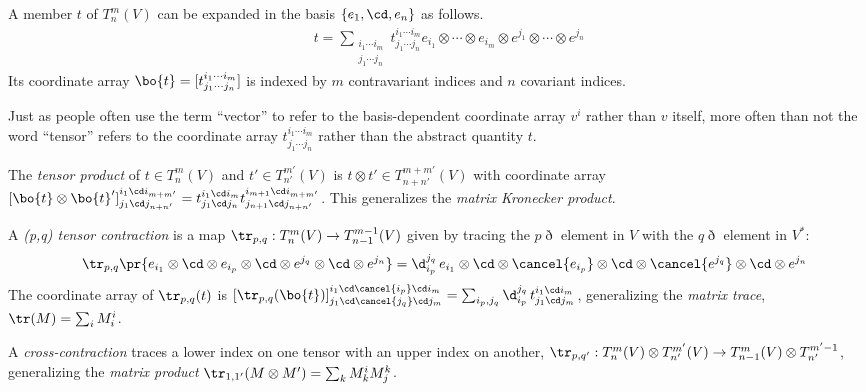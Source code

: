 \documentclass[11pt,fleqn]{article}
\numberwithin{equation}{section}
\begin{document}
\begin{rmk}
A member $t$ of $T_n^m(V)$ can be expanded in the basis $\{e_1,\cd,e_n\}$ as follows.
\begin{align}
&&
  t
=
  \sum_{\substack{i_1\cdots i_m\\j_1\cdots j_n}}
  t_{j_1\cdots j_n}^{i_1\cdots i_m}
  e_{i_1}\otimes\cdots\otimes e_{i_m}\otimes e^{j_1}\otimes\cdots\otimes e^{j_n}
\end{align}
Its coordinate array $\bo{t}=[t^{i_1\cdots i_m}_{j_1\cdots j_n}]$ is indexed by $m$ contravariant indices and $n$ covariant indices.
\end{rmk}

\begin{rmk}
Just as people often use the term ``vector'' to refer to the basis-dependent coordinate array $v^i$ rather than $v$ itself, more often than not the word ``tensor'' refers to the coordinate array $t^{i_1\cdots i_m}_{j_1\cdots j_n}$ rather than the abstract quantity $t$.
\end{rmk}

\begin{dfn}
The \textit{tensor product} of $t\in T_n^m(V)$ and $t'\in T_{n'}^{m'}(V)$ is $t\otimes t'\in T_{n+n'}^{m+m'}(V)$ with coordinate array $[\bo{t}\otimes \bo{t}']_{j_1\cd j_{n+n'}}^{i_1\cd i_{m+m'}} = t_{j_1\cd j_n}^{i_1\cd i_m}t_{j_{n+1}\cd j_{n+n'}}^{i_{m+1}\cd i_{m+m'}}$.
This generalizes the \textit{matrix Kronecker product}.
\end{dfn}

\begin{dfn}
A \textit{(p,q) tensor contraction} is a map $\tr_{p,q}:T_n^m(V)\rightarrow T_{n-1}^{m-1}(V)$ given by tracing the $p\eth$ element in $V$ with the $q\eth$ element in $V^*$:
\begin{align}
&&
  \tr_{p,q}\pr{
    e_{i_1}\otimes\cd\otimes e_{i_p}\otimes\cd\otimes e^{j_q}\otimes\cd\otimes e^{j_n}
  }
=
  \d_{i_p}^{j_q}\,
  e_{i_1}\otimes\cd\otimes \cancel{e_{i_p}}\otimes\cd\otimes 
  \cancel{e^{j_q}}\otimes\cd\otimes e^{j_n}
\end{align}
The coordinate array of $\tr_{p,q}(t)$ is $[\tr_{p,q}(\bo{t})]^{i_1\cd \cancel{i_p}\cd i_m}_{j_1\cd \cancel{j_q}\cd j_m}=\sum_{i_p,j_q}\d_{i_p}^{j_q}\,t^{i_1\cd i_m}_{j_1\cd j_m}$, generalizing the \textit{matrix trace}, $\tr(M)=\sum_i M_i^i$.
\end{dfn}

\begin{dfn}
A \textit{cross-contraction} traces a lower index on one tensor with an upper index on another, $\tr_{p,q'}:T_n^m(V)\otimes T_{n'}^{m'}(V)\rightarrow T^{m}_{n-1}(V)\otimes T^{m'-1}_{n'}$, generalizing the \textit{matrix product} $\tr_{1,1'}(M\otimes M')=\sum_k M^i_kM^k_j$.
\end{dfn}
\end{document}

